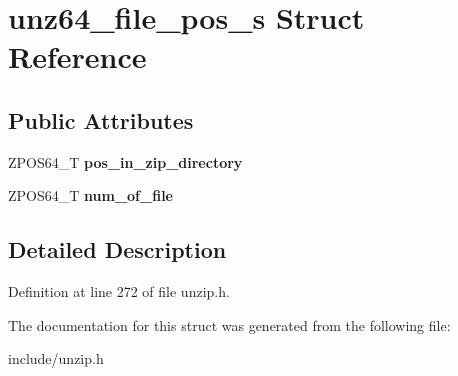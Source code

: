 \hypertarget{structunz64__file__pos__s}{\section{unz64\-\_\-file\-\_\-pos\-\_\-s Struct Reference}
\label{structunz64__file__pos__s}
}
\subsection*{Public Attributes}
\begin{DoxyCompactItemize}
\item 
\hypertarget{structunz64__file__pos__s_a56b202151059b18903fe46dacbfbf12d}{Z\-P\-O\-S64\-\_\-\-T {\bfseries pos\-\_\-in\-\_\-zip\-\_\-directory}}\label{structunz64__file__pos__s_a56b202151059b18903fe46dacbfbf12d}

\item 
\hypertarget{structunz64__file__pos__s_a3750057b6e72229a7acfb12b23bcb2fb}{Z\-P\-O\-S64\-\_\-\-T {\bfseries num\-\_\-of\-\_\-file}}\label{structunz64__file__pos__s_a3750057b6e72229a7acfb12b23bcb2fb}

\end{DoxyCompactItemize}


\subsection{Detailed Description}


Definition at line 272 of file unzip.\-h.



The documentation for this struct was generated from the following file\-:\begin{DoxyCompactItemize}
\item 
include/unzip.\-h\end{DoxyCompactItemize}
